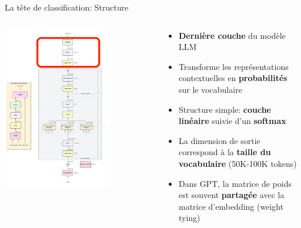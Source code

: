 \documentclass[aspectratio=169]{beamer}
\begin{document}
\begin{frame}{La tête de classification: Structure}
    \begin{columns}
        \begin{column}{0.5\textwidth}
            \begin{center}
                \includegraphics[width=0.7\textwidth]{images/gpt2_classif.png}
            \end{center}
        \end{column}
        \begin{column}{0.5\textwidth}
            \begin{itemize}
                \item \textbf{Dernière couche} du modèle LLM
                \item Transforme les représentations contextuelles en \textbf{probabilités} sur le vocabulaire
                \item Structure simple: \textbf{couche linéaire} suivie d'un \textbf{softmax}
                \item La dimension de sortie correspond à la \textbf{taille du vocabulaire} (50K-100K tokens)
                \item Dans GPT, la matrice de poids est souvent \textbf{partagée} avec la matrice d'embedding (weight tying)
            \end{itemize}
        \end{column}
    \end{columns}
\end{frame}
\end{document}
